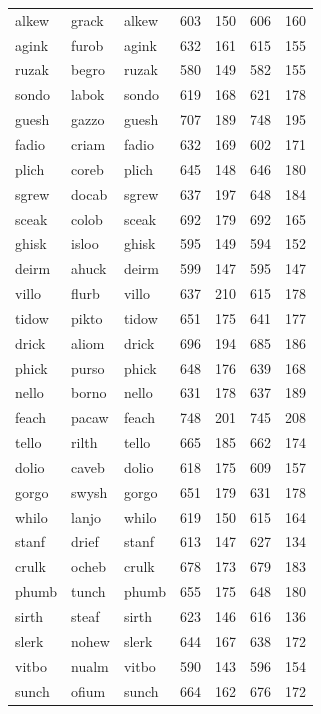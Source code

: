 \documentclass[
]{interact}
\begin{document}
\begin{longtable*}{lllrrrr}
\midrule\addlinespace[2.5pt]
 \\ 
\midrule\addlinespace[2.5pt]
alkew & grack & alkew & 603 & 150 & 606 & 160 \\ 
agink & furob & agink & 632 & 161 & 615 & 155 \\ 
ruzak & begro & ruzak & 580 & 149 & 582 & 155 \\ 
sondo & labok & sondo & 619 & 168 & 621 & 178 \\ 
guesh & gazzo & guesh & 707 & 189 & 748 & 195 \\ 
fadio & criam & fadio & 632 & 169 & 602 & 171 \\ 
plich & coreb & plich & 645 & 148 & 646 & 180 \\ 
sgrew & docab & sgrew & 637 & 197 & 648 & 184 \\ 
sceak & colob & sceak & 692 & 179 & 692 & 165 \\ 
ghisk & isloo & ghisk & 595 & 149 & 594 & 152 \\ 
deirm & ahuck & deirm & 599 & 147 & 595 & 147 \\ 
villo & flurb & villo & 637 & 210 & 615 & 178 \\ 
tidow & pikto & tidow & 651 & 175 & 641 & 177 \\ 
drick & aliom & drick & 696 & 194 & 685 & 186 \\ 
phick & purso & phick & 648 & 176 & 639 & 168 \\ 
nello & borno & nello & 631 & 178 & 637 & 189 \\ 
feach & pacaw & feach & 748 & 201 & 745 & 208 \\ 
tello & rilth & tello & 665 & 185 & 662 & 174 \\ 
dolio & caveb & dolio & 618 & 175 & 609 & 157 \\ 
gorgo & swysh & gorgo & 651 & 179 & 631 & 178 \\ 
whilo & lanjo & whilo & 619 & 150 & 615 & 164 \\ 
stanf & drief & stanf & 613 & 147 & 627 & 134 \\ 
crulk & ocheb & crulk & 678 & 173 & 679 & 183 \\ 
phumb & tunch & phumb & 655 & 175 & 648 & 180 \\ 
sirth & steaf & sirth & 623 & 146 & 616 & 136 \\ 
slerk & nohew & slerk & 644 & 167 & 638 & 172 \\ 
vitbo & nualm & vitbo & 590 & 143 & 596 & 154 \\ 
sunch & ofium & sunch & 664 & 162 & 676 & 172 \\ 

\end{longtable*}
\end{document}
